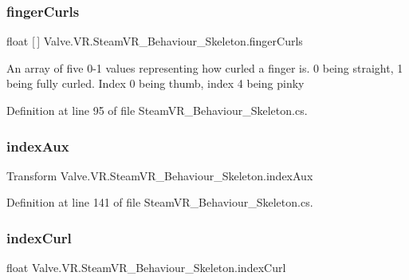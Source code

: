 \subsubsection{\texorpdfstring{fingerCurls}{fingerCurls}}
{\footnotesize\ttfamily float \mbox{[}$\,$\mbox{]} Valve.\+V\+R.\+Steam\+V\+R\+\_\+\+Behaviour\+\_\+\+Skeleton.\+finger\+Curls\hspace{0.3cm}{\ttfamily [get]}}



An array of five 0-\/1 values representing how curled a finger is. 0 being straight, 1 being fully curled. Index 0 being thumb, index 4 being pinky 



Definition at line 95 of file Steam\+V\+R\+\_\+\+Behaviour\+\_\+\+Skeleton.\+cs.

\mbox{\label{class_valve_1_1_v_r_1_1_steam_v_r___behaviour___skeleton_a2b5eaaf9e5b19bb7c5246de93e13352d}} 
\subsubsection{\texorpdfstring{indexAux}{indexAux}}
{\footnotesize\ttfamily Transform Valve.\+V\+R.\+Steam\+V\+R\+\_\+\+Behaviour\+\_\+\+Skeleton.\+index\+Aux\hspace{0.3cm}{\ttfamily [get]}}



Definition at line 141 of file Steam\+V\+R\+\_\+\+Behaviour\+\_\+\+Skeleton.\+cs.

\mbox{\label{class_valve_1_1_v_r_1_1_steam_v_r___behaviour___skeleton_aade754ed570d7e41456f7deef4c63d64}} 
\subsubsection{\texorpdfstring{indexCurl}{indexCurl}}
{\footnotesize\ttfamily float Valve.\+V\+R.\+Steam\+V\+R\+\_\+\+Behaviour\+\_\+\+Skeleton.\+index\+Curl\hspace{0.3cm}{\ttfamily [get]}}



